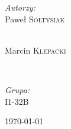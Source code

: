 \begin{titlepage}
\begin{center}
\begin{minipage}{0.4\textwidth}
\begin{flushleft} \large
\emph{Autorzy:}\\
Paweł \textsc{Sołtysiak}
\end{flushleft}
\end{minipage}
\begin{minipage}{0.4\textwidth}
\begin{flushright} \large
~\\
Marcin \textsc{Klepacki}
\end{flushright}
\end{minipage}
~\\[0.5cm]
\begin{minipage}{0.82\textwidth}
\begin{flushleft} \large
\emph{Grupa:}\\
\textsc{I1-32B}
\end{flushleft}
\end{minipage}


\vfill

{\large \today}

\end{center}
\end{titlepage}